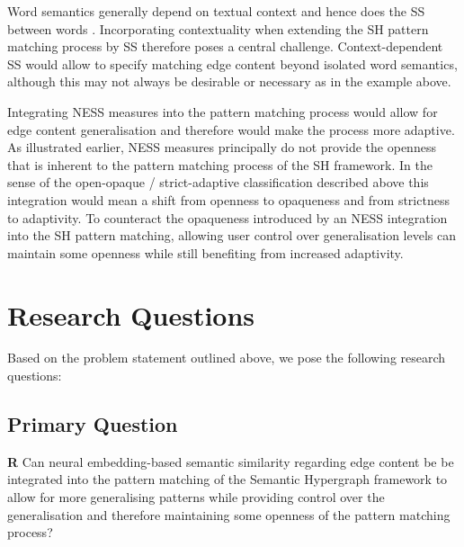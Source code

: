\documentclass[11pt]{scrreprt}
\let\cite\parencite  %
\begin{document}
Word semantics generally depend on textual context and hence does the SS between words \cite[Section~2.2.3]{harispeSemanticSimilarityNatural2015}. Incorporating contextuality when extending the SH pattern matching process by SS therefore poses a central challenge. Context-dependent SS would allow to specify matching edge content beyond isolated word semantics, although this may not always be desirable or necessary as in the example above. 


Integrating NESS measures into the pattern matching process would allow for edge content generalisation and therefore would make the process more adaptive. As illustrated earlier, NESS measures principally do not provide the openness that is inherent to the pattern matching process of the SH framework. In the sense of the open-opaque / strict-adaptive classification described above this integration would mean a shift from openness to opaqueness and from strictness to adaptivity. To counteract the opaqueness introduced by an NESS integration into the SH pattern matching, allowing user control over generalisation levels can maintain some openness while still benefiting from increased adaptivity.

\section{Research Questions}
\label{sec:research-questions}
Based on the problem statement outlined above, we pose the following research questions:

\subsection{Primary Question}
\textbf{R} Can neural embedding-based semantic similarity regarding edge content be be integrated into the pattern matching of the Semantic Hypergraph framework to allow for more generalising patterns while providing control over the generalisation and therefore maintaining some openness of the pattern matching process?
\end{document}
